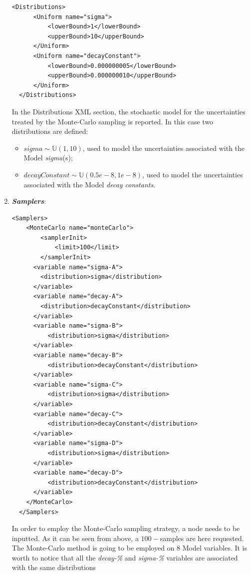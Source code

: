 \begin{enumerate}
\begin{lstlisting}[style=XML,morekeywords={arg,extension,pauseAtEnd,overwrite}]
  <Distributions>
      <Uniform name="sigma">
          <lowerBound>1</lowerBound>
          <upperBound>10</upperBound>
      </Uniform>
      <Uniform name="decayConstant">
          <lowerBound>0.000000005</lowerBound>
          <upperBound>0.000000010</upperBound>
      </Uniform>
  </Distributions>   
\end{lstlisting}
  In the Distributions XML section, the stochastic model for the 
  uncertainties  treated by the Monte-Carlo sampling is reported. In 
  this case two distributions are defined: 
  \begin{itemize}
    \item $sigma \sim \mathbb{U}(1,10)$, used to model the uncertainties 
    associated with  the Model \textit{sigma}(s);
    \item  $decayConstant \sim \mathbb{U}(0.5e-8,1e-8)$,  used to 
    model the uncertainties 
    associated with  the Model \textit{decay constants}.
  \end{itemize}
   \item \textbf{\textit{Samplers}}:
\begin{lstlisting}[style=XML,morekeywords={arg,extension,pauseAtEnd,overwrite}]
  <Samplers>
    <MonteCarlo name="monteCarlo">
        <samplerInit>
            <limit>100</limit>
        </samplerInit>
      <variable name="sigma-A">
        <distribution>sigma</distribution>
      </variable>
      <variable name="decay-A">
        <distribution>decayConstant</distribution>
      </variable>
      <variable name="sigma-B">
          <distribution>sigma</distribution>
      </variable>
      <variable name="decay-B">
          <distribution>decayConstant</distribution>
      </variable>
      <variable name="sigma-C">
          <distribution>sigma</distribution>
      </variable>
      <variable name="decay-C">
          <distribution>decayConstant</distribution>
      </variable>
      <variable name="sigma-D">
          <distribution>sigma</distribution>
      </variable>
      <variable name="decay-D">
          <distribution>decayConstant</distribution>
      </variable>
    </MonteCarlo>
  </Samplers>   
\end{lstlisting}
  In order to employ the Monte-Carlo sampling strategy, a 
   node needs to be inputted. As it can be
  seen from above, a $100-$samples are here requested. The 
  Monte-Carlo method is going to be employed on $8$ Model variables.
  It is worth to notice that all the \textit{decay-\%} and 
  \textit{sigma-\%} variables are associated with the same distributions 

\end{enumerate}
